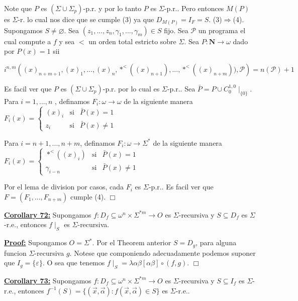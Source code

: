Note que \(P\) es \((\Sigma \cup \Sigma _{p})\)-p.r. y por lo tanto \(P\) es \( \Sigma \)-p.r.. Pero entonces \(M(P)\) es \(\Sigma \)-r. lo cual nos dice que se cumple (3) ya que \(D_{M(P)}=I_{F}=S\).
(3)\(\Rightarrow \)(4). Supongamos \(S\neq \varnothing \). Sea \( (z_{1},...,z_{n},\gamma _{1},...,\gamma _{m})\in S\) fijo. Sea \(\mathcal{P}\) un programa el cual compute a \(f\) y sea \(< \) un orden total estricto sobre \( \Sigma \). Sea \(P:\mathbf{N}\rightarrow \omega \) dado por \(P(x)=1\) sii

\(\displaystyle i^{n,m}\left( (x)_{n+m+1},(x)_{1},...,(x)_{n},\ast ^{< }((x)_{n+1}),...,\ast ^{< }((x)_{n+m})),\mathcal{P}\right) =n(\mathcal{P})+1 \)

Es facil ver que \(P\) es \((\Sigma \cup \Sigma _{p})\)-p.r. por lo cual es \( \Sigma \)-p.r.. Sea \(\bar{P}=P\cup C_{0}^{1,0}\mid _{\{0\}}\). Para \(i=1,...,n\) , definamos \(F_{i}:\omega \rightarrow \omega \) de la siguiente manera
\(\displaystyle F_{i}(x)=\left\{ \begin{array}{ccc} (x)_{i} & \text{si} & \bar{P}(x)=1 \\ z_{i} & \text{si} & \bar{P}(x)\neq 1 \end{array} \right. \)

Para \(i=n+1,...,n+m\), definamos \(F_{i}:\omega \rightarrow \Sigma ^{\ast }\) de la siguiente manera
\(\displaystyle F_{i}(x)=\left\{ \begin{array}{lll} \ast ^{< }((x)_{i}) & \text{si} & \bar{P}(x)=1 \\ \gamma _{i-n} & \text{si} & \bar{P}(x)\neq 1 \end{array} \right. \)

Por el lema de division por casos, cada \(F_{i}\) es \(\Sigma \)-p.r.. Es facil ver que \(F=(F_{1},...,F_{n+m})\) cumple (4). \(\Box\)


\textbf{\underline{Corollary 72:}} Supongamos \(f:D_{f}\subseteq \omega ^{n}\times \Sigma ^{\ast m}\rightarrow O\) es \(\Sigma \)-recursiva y \(S\subseteq D_{f}\) es \( \Sigma \)-r.e., entonces \(f\mid _{S}\) es \(\Sigma \)-recursiva.


\textbf{\underline{Proof:}} Supongamos \(O=\Sigma ^{\ast }.\) Por el Theorem anterior \(S=D_{g}\), para alguna funcion \(\Sigma \)-recursiva \(g.\) Notese que componiendo adecuadamente podemos suponer que \(I_{g}=\{\varepsilon \}.\) O sea que tenemos \(f\mid _{S}=\lambda \alpha \beta \left[ \alpha \beta \right] \circ (f,g)\). \(\Box\)


\textbf{\underline{Corollary 73:}} Supongamos \(f:D_{f}\subseteq \omega ^{n}\times \Sigma ^{\ast m}\rightarrow O\) es \(\Sigma \)-recursiva y \(S\subseteq I_{f}\) es \(\Sigma \)-r.e., entonces \( f^{-1}(S)=\{(\vec{x},\vec{\alpha}):f(\vec{x},\vec{\alpha})\in S\}\) es \( \Sigma \)-r.e..

